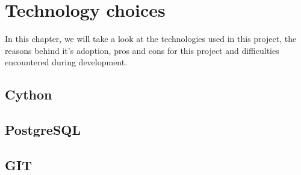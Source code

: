\chapter{Technology choices}

  In this chapter, we will take a look at the technologies used in this project,
  the reasons behind it's adoption, pros and cons for this project and
  difficulties encountered during development.

  
  
  \section{Cython}
  \section{PostgreSQL}
  \section{GIT}
